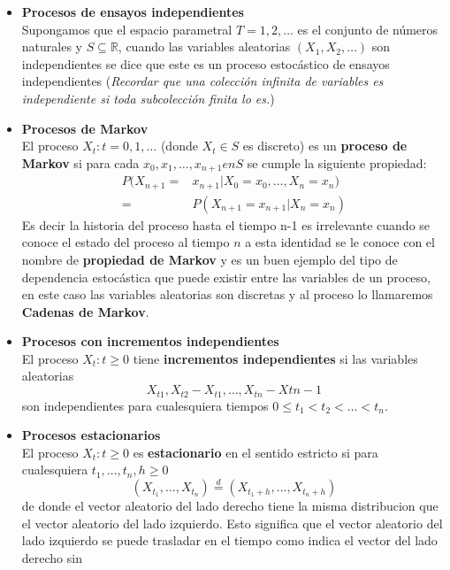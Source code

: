 \documentclass[10pt,a4paper]{article}
\theoremstyle{definition}
\theoremstyle{remark}
\newcommand{\ds}{\displaystyle}
\begin{document}
\begin{multicols}{2}
\begin{itemize}
	\item \textbf{Procesos de ensayos independientes}\\
	Supongamos que el espacio parametral $T={1,2,\dots}$ es el conjunto de números 
	naturales y $\ds{S \subseteq \mathbb{R}}$, cuando las variables aleatorias $\ds{       (X_{1},X_{2},\dots)}$ son independientes se dice que este es un proceso estocástico de
	ensayos independientes (\textit{Recordar que una colección infinita de variables es independiente si toda subcolección finita lo es.})\\
	\item \textbf{Procesos de Markov} \\
	El proceso ${X_{t}: t=0,1,\dots}$ (donde $X_{t} \in S$ es discreto) es un 
	\textbf{proceso de Markov} si para cada $x_0,x_1,\dots,x_{n+1} en S$ se cumple la 
	siguiente propiedad:
	\begin{align*}
	P(X_{n+1}=& x_{n+1}|X_0=x_0,\dots,X_n=x_n)\\
	=& P(X_{n+1}=x_{n+1}|X_{n}=x_n)
	\end{align*}
	Es decir la historia del proceso hasta el tiempo n-1 es irrelevante cuando se conoce 
	el estado del proceso al tiempo $n$ a esta identidad se le conoce con el nombre de 
	\textbf{propiedad de Markov} y es un buen ejemplo del tipo de 
	dependencia estocástica que puede existir entre las variables de un proceso, en este 
	caso las variables aleatorias son discretas y al proceso lo llamaremos 
	\textbf{Cadenas de Markov}.\\
	\item \textbf{Procesos con incrementos independientes} \\
	El proceso $ {X_{t}: t \geq 0}$ tiene \textbf{incrementos independientes} si las 
	variables aleatorias $$X_{t1},X_{t2}-X_{t1},\dots, X_{tn}- X{tn-1}$$ son 
	independientes para cualesquiera tiempos  $0\leq t_{1}<t_{2}<\dots<t_{n}.$\\
	\item \textbf{Procesos estacionarios}\\
	El proceso ${X_{t}:t\geq0}$ es \textbf{estacionario} en el sentido estricto si para 
	cualesquiera $t_1,\dots,t_n,h \geq 0$
	$$(X_{t_1},\dots,X_{t_n})\stackrel{d}{=}(X_{t_1+h},\dots,X_{t_n+h})$$
	de donde el vector aleatorio del lado derecho tiene la misma distribucion que el 
	vector aleatorio del lado izquierdo. Esto significa que el vector aleatorio del lado 
	izquierdo se puede trasladar en el tiempo como indica el vector del lado derecho sin 

\end{itemize}
\end{multicols}
\end{document}
